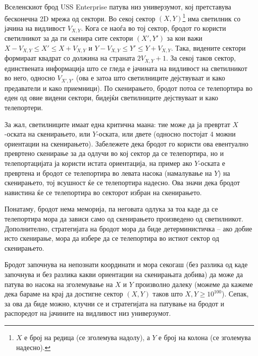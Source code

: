 \documentclass[12pt]{article}
\begin{document}
\renewcommand{\headerLang}{English}
\renewcommand{\problemName}{AB13. Vision}

\renewcommand{\headerLeft}{IATI Day 1, Senior group}
\renewcommand{\headerRightFirst}{XVII INTERNATIONAL ADVANCED TOURNAMENT IN INFORMATICS}
\renewcommand{\headerRightSecond}{ONLINE 2026}

\renewcommand{\tl}{$5$ s}
\renewcommand{\ml}{$1024$ MB}
\problem{Задача \problemName}

Вселенскиот брод USS Enterprise патува низ универзумот, кој претставува бесконечна 2D мрежа од сектори. Во секој сектор $(X, Y)$\footnote{$X$ е број на редица (се зголемува надолу), а $Y$ е број на колона (се зголемува надесно).} има светилник со јачина на видливост $V_{X, Y}$. Кога се наоѓа во тој сектор, бродот го користи светилникот за да ги скенира сите сектори $(X', Y')$ за кои важи $X - V_{X, Y} \leq X' \leq X + V_{X, Y}$ и  $Y - V_{X, Y} \leq Y' \leq Y + V_{X, Y}$. Така, видените сектори формираат квадрат со должина на страната $2V_{X, Y} + 1$. За секој таков сектор, единствената информација што се гледа е јачината на видливост на светилникот во него, односно $V_{X', Y'}$ (ова е затоа што светилниците дејствуваат и како предаватели и како приемници). По скенирањето, бродот потоа се телепортира во еден од овие видени сектори, бидејќи светилниците дејствуваат и како телепортери.

За жал, светилниците имаат една критична маана: тие може да ја превртат $X$-оската на скенирањето, или $Y$-оската, или двете (односно постојат $4$ можни ориентации на скенирањето). Забележете дека бродот го користи ова евентуално превртено скенирање за да одлучи во кој сектор да се телепортира, но и телепортацијата ја користи истата ориентација, на пример ако $Y$-оската е превртена и бродот се телепортира во левата насока (намалување на $Y$) на скенирањето, тој всушност ќе се телепортира надесно. Ова значи дека бродот навистина ќе се телепортира во секторот избран на скенирањето.

Понатаму, бродот нема меморија, па неговата одлука за тоа каде да се телепортира мора да зависи само од скенирањето произведено од светилникот. Дополнително, стратегијата на бродот мора да биде детерминистичка -- ако добие исто скенирање, мора да избере да се телепортира во истиот сектор од скенирањето.

Бродот започнува на непознати координати и мора секогаш (без разлика од каде започнува и без разлика какви ориентации на скенирањата добива) да може да патува во насока на зголемување на $X$ и $Y$ произволно далеку (можеме да кажеме дека бараме на крај да достигне сектор $(X, Y)$ таков што $X, Y \geq 10^{100}$). Сепак, за ова да биде можно, клучни се и стратегијата на патување на бродот и распоредот на јачините на видливост низ универзумот.
\end{document}
